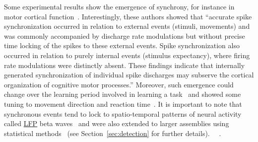 \documentclass[brainsci, %
               review,accept,pdftex,moreauthors
               ]{Definitions/mdpi}
\begin{document}
Some experimental results show the emergence of synchrony, for instance in motor cortical function~\citep{riehle_spike_1997}. Interestingly, these authors showed that ``accurate spike synchronization occurred in relation to external events (stimuli, movements) and was commonly accompanied by discharge rate modulations but without precise time locking of the spikes to these external events. Spike synchronization also occurred in relation to purely internal events (stimulus expectancy), where firing rate modulations were distinctly absent. These findings indicate that internally generated synchronization of individual spike discharges may subserve the cortical organization of cognitive motor processes.'' Moreover, such emergence could change over the learning period involved in learning a task~\citep{kilavik_long-term_2009} and showed some tuning to movement direction and reaction time~\citep{grammont_spike_2003}. It is important to note that synchronous events tend to lock to spatio-temporal patterns of neural activity called \href{https://en.wikipedia.org/wiki/Local_field_potential}{LFP} beta waves~\citep{denker_lfp_2018} and were also extended to larger assemblies using statistical methods~\citep{torre_asset_2016} (see Section~\ref{sec:detection} for further details). ~\citep{ben-yishai_traveling_1997}~\citep{bruno_cortex_2006}. 
\end{document}
